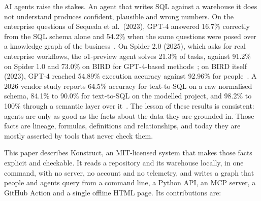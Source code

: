 AI agents raise the stakes. An agent that writes SQL against a warehouse it does not understand
produces confident, plausible and wrong numbers. On the enterprise questions of Sequeda et al.\
(2023), GPT-4 answered 16.7\% correctly from the SQL schema alone and 54.2\% when the same
questions were posed over a knowledge graph of the business~\citep{sequeda2023benchmark}. On
Spider 2.0 (2025), which asks for real enterprise workflows, the o1-preview agent solves 21.3\% of
tasks, against 91.2\% on Spider 1.0 and 73.0\% on BIRD for GPT-4-based
methods~\citep{lei2025spider2}; on BIRD itself (2023), GPT-4 reached 54.89\% execution accuracy
against 92.96\% for people~\citep{li2023bird}. A 2026 vendor study reports 64.5\% accuracy for
text-to-SQL on a raw normalised schema, 84.1\% to 90.0\% for text-to-SQL on the modelled project,
and 98.2\% to 100\% through a semantic layer over it~\citep{dbt2026semantic}. The lesson of these results is consistent:
agents are only as good as the facts about the data they are grounded in. Those facts are
lineage, formulas, definitions and relationships, and today they are mostly asserted by tools
that never check them.

This paper describes Konstruct, an MIT-licensed system that makes those facts explicit and
checkable. It reads a repository and its warehouse locally, in one command, with no server, no
account and no telemetry, and writes a graph that people and agents query from a command line,
a Python API, an MCP server, a GitHub Action and a single offline HTML page. Its contributions
are:

